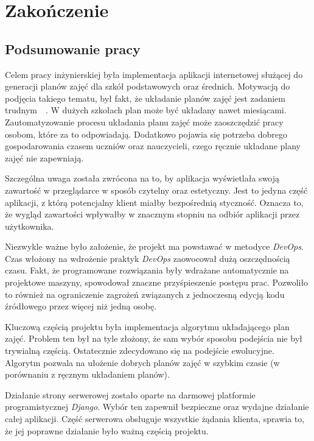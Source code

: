
\chapter{Zakończenie}

\section{Podsumowanie pracy}

Celem pracy inżynierskiej była implementacja aplikacji internetowej służącej do generacji planów zajęć dla szkół podstawowych oraz średnich. Motywacją do podjęcia takiego tematu, był fakt, że układanie planów zajęć jest zadaniem trudnym~\cite{trudne_plany_a}~\cite{trudne_plany_b}. W dużych szkołach plan może być układany nawet miesiącami. Zautomatyzowanie procesu układania planu zajęć może zaoszczędzić pracy osobom, które za to odpowiadają. Dodatkowo pojawia się potrzeba dobrego gospodarowania czasem uczniów oraz nauczycieli, czego ręcznie układane plany zajęć nie zapewniają.

Szczególna uwaga została zwrócona na to, by aplikacja wyświetlała swoją zawartość w przeglądarce w sposób czytelny oraz estetyczny. Jest to jedyna część aplikacji, z którą potencjalny klient miałby bezpośrednią styczność. Oznacza to, że wygląd zawartości wpływałby w znacznym stopniu na odbiór aplikacji przez użytkownika.

Niezwykle ważne było założenie, że projekt ma powstawać w metodyce \textit{DevOps}. Czas włożony na wdrożenie praktyk \textit{DevOps} zaowocował dużą oszczędnością czasu. Fakt, że programowane rozwiązania były wdrażane automatycznie na projektowe maszyny, spowodował znaczne przyśpieszenie postępu prac. Pozwoliło to również na ograniczenie zagrożeń związanych z jednoczesną edycją kodu źródłowego przez więcej niż jedną osobę.

Kluczową częścią projektu była implementacja algorytmu układającego plan zajęć. Problem ten był na tyle złożony, że sam wybór sposobu podejścia nie był trywialną częścią. Ostatecznie zdecydowano się na podejście ewolucyjne. Algorytm pozwala na ułożenie dobrych planów zajęć w szybkim czasie (w porównaniu z ręcznym układaniem planów).

Działanie strony serwerowej zostało oparte na darmowej platformie programistycznej \textit{Django}. Wybór ten zapewnił bezpieczne oraz wydajne działanie całej aplikacji. Część serwerowa obsługuje wszystkie żądania klienta, sprawia to, że jej poprawne działanie było ważną częścią projektu.

